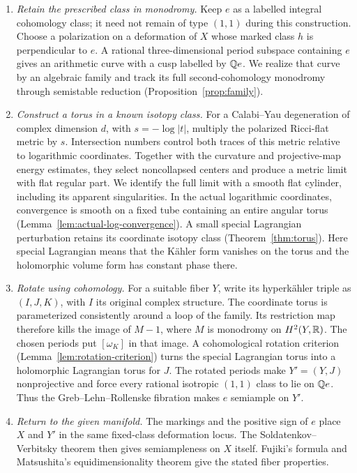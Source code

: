 \begin{enumerate}[leftmargin=*,label=\textup{(\arabic*)}]
\item \emph{Retain the prescribed class in monodromy.}
Keep $e$ as a labelled integral cohomology class; it need not remain
of type $(1,1)$ during this construction.
Choose a polarization on a deformation of $X$ whose marked class
$h$ is perpendicular to $e$.
A rational three-dimensional period subspace containing $e$
gives an arithmetic curve with a cusp labelled by $\mathbb Q e$.
We realize that curve by an algebraic family and track its full
second-cohomology monodromy through semistable reduction
(Proposition~\ref{prop:family}).

\item \emph{Construct a torus in a known isotopy class.}
For a Calabi--Yau degeneration of complex dimension $d$, with
$s=-\log|t|$, multiply the polarized Ricci-flat metric by $s$.
Intersection numbers control both traces of this metric relative
to logarithmic coordinates. Together with the curvature and
projective-map energy estimates, they select noncollapsed centers
and produce a metric limit with flat regular part.
We identify the full limit with a smooth flat cylinder, including
its apparent singularities. In the actual logarithmic coordinates,
convergence is smooth on a fixed tube containing an entire angular
torus (Lemma~\ref{lem:actual-log-convergence}). A small special Lagrangian
perturbation retains its coordinate isotopy class
(Theorem~\ref{thm:torus}). Here special Lagrangian means that the
K\"ahler form vanishes on the torus and the holomorphic volume
form has constant phase there.

\item \emph{Rotate using cohomology.}
For a suitable fiber $Y$, write its hyperk\"ahler triple as
$(I,J,K)$, with $I$ its original complex structure. The coordinate
torus is parameterized consistently around a loop of the family.
Its restriction map therefore kills the image of $M-1$, where
$M$ is monodromy on $H^2(Y,\mathbb R)$. The chosen periods put
$[\omega_K]$ in that image. A cohomological rotation criterion
(Lemma~\ref{lem:rotation-criterion}) turns the special Lagrangian
torus into a holomorphic Lagrangian torus for $J$.
The rotated periods make $Y'=(Y,J)$ nonprojective and force every
rational isotropic $(1,1)$ class to lie on $\mathbb Q e$.
Thus the Greb--Lehn--Rollenske fibration makes $e$ semiample on $Y'$.

\item \emph{Return to the given manifold.}
The markings and the positive sign of $e$ place $X$ and $Y'$ in
the same fixed-class deformation locus. The
Soldatenkov--Verbitsky theorem then gives semiampleness on $X$
itself. Fujiki's formula and Matsushita's equidimensionality theorem
give the stated fiber properties.
\end{enumerate}

